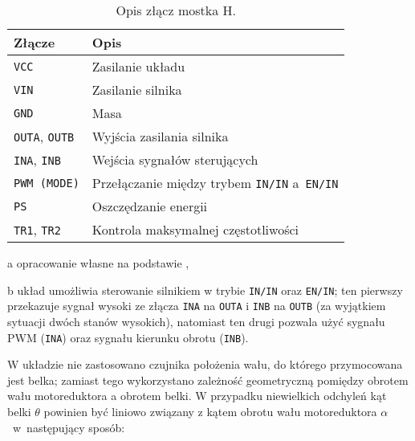 \begin{table}[H]
    \centering
    \begin{threeparttable}
        \caption{Opis złącz mostka H.}
        \label{tab:zlacza_mostka_H}
        
        \begin{tabularx}{0.67\textwidth}{l | l}
            \toprule
            Złącze & Opis \\
            \midrule
            \texttt{VCC} & Zasilanie układu \\
            \texttt{VIN} & Zasilanie silnika \\
            \texttt{GND} & Masa \\
            \texttt{OUTA}, \texttt{OUTB} & Wyjścia zasilania silnika \\
            \texttt{INA}, \texttt{INB} & Wejścia sygnałów sterujących \\
            \texttt{PWM (MODE)} & Przełączanie między trybem \texttt{IN/IN} a~\texttt{EN/IN}\tnote{b} \\
            \texttt{PS} & Oszczędzanie energii \\
            \texttt{TR1}, \texttt{TR2} & Kontrola maksymalnej częstotliwości \\
            \bottomrule
        \end{tabularx}
        
        \begin{tablenotes}
            \footnotesize
            \item[a] opracowanie własne na podstawie \cite{MOSTEK_H_MANUAL},
            \item[b] układ umożliwia sterowanie silnikiem w trybie \texttt{IN/IN} oraz \texttt{EN/IN}; ten pierwszy przekazuje sygnał wysoki ze złącza \texttt{INA} na \texttt{OUTA} i \texttt{INB} na \texttt{OUTB} (za wyjątkiem sytuacji dwóch stanów wysokich), natomiast ten drugi pozwala użyć sygnału PWM (\texttt{INA}) oraz sygnału kierunku obrotu (\texttt{INB}).
        \end{tablenotes}
    \end{threeparttable}
\end{table}

W układzie nie zastosowano czujnika położenia wału, do którego przymocowana jest belka; zamiast tego wykorzystano zależność geometryczną pomiędzy obrotem wału motoreduktora a obrotem belki. W przypadku niewielkich odchyleń kąt belki $\theta$ powinien być liniowo związany z kątem obrotu wału motoreduktora $\alpha$~w~następujący sposób:


